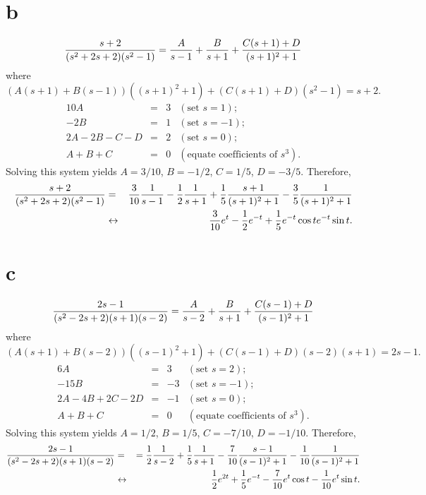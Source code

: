 \documentclass[dvips]{book}
\numberwithin{example}{section}
\numberwithin{equation}{section}
\numberwithin{theorem}{section}
\numberwithin{table}{section}
\numberwithin{figure}{section}
\begin{document}
\part{b}
$$
{s+2\over(s^2+2s+2)(s^2-1)}
={A\over s-1}+{B\over s+1}+{C(s+1)+D\over(s+1)^2+1}
$$
where
$$
(A(s+1)+B(s-1))((s+1)^2+1)+(C(s+1)+D)(s^2-1)=s+2.
$$
$$
\begin{array}{rcrl}
10A&=&3&(\mbox{set }s=1);\\
-2B&=&1& (\mbox{set }s=-1);\\
2A-2B-C-D&=&2& (\mbox{set }s=0);\\
A+B+C&=&0&(\mbox{equate coefficients of }s^3).
\end{array}
$$
Solving this system yields $A=3/10$, $B=-1/2$,
$C=1/5$, $D=-3/5$. Therefore,
\begin{eqnarray*}
{s+2\over(s^2+2s+2)(s^2-1)}
&=&
{3\over 10}{1\over s-1}-{1\over2}{1\over s+1}+{1\over5}{s+1\over(s+1)^2+1}
-{3\over5}{1\over(s+1)^2+1}
\\&\leftrightarrow&
{3\over 10}e^{t}-{1\over2}e^{-t}
+{1\over5}e^{-t}\cos te^{-t}\sin t.
\end{eqnarray*}

\part{c}
$$
{2s-1\over(s^2-2s+2)(s+1)(s-2)}
={A\over s-2}+{B\over s+1}+{C(s-1)+D\over(s-1)^2+1}
$$
where
$$
(A(s+1)+B(s-2))((s-1)^2+1)+(C(s-1)+D)(s-2)(s+1)=2s-1.
$$
$$
\begin{array}{rcrl}
6A&=&3&(\mbox{set }s=2);\\
-15B&=&-3& (\mbox{set }s=-1);\\
2A-4B+2C-2D&=&-1& (\mbox{set }s=0);\\
A+B+C&=&0&(\mbox{equate coefficients of }s^3).
\end{array}
$$
Solving this system yields $A=1/2$, $B=1/5$,
$C=-7/10$, $D=-1/10$. Therefore,
\begin{eqnarray*}
{2s-1\over(s^2-2s+2)(s+1)(s-2)}
&=&
={1\over2}{1\over s-2}+{1\over5}{1\over s+1}-{7\over 10}{s-1\over(s-1)^2+1}
-{1\over 10}{1\over(s-1)^2+1}
\\&\leftrightarrow&
{1\over2}e^{2t}+{1\over5} e^{-t}
-{7\over 10}e^t\cos t-{1\over10}e^t\sin t.
\end{eqnarray*}
\end{document}
